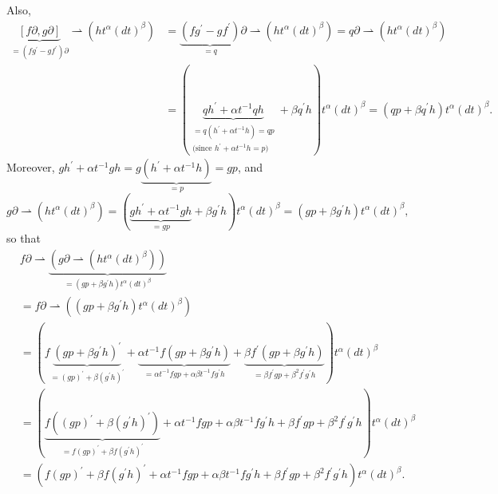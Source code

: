 \documentclass[etingof-lie.tex]{subfiles}
\begin{document}
Also,%
\begin{align*}
\underbrace{\left[  f\partial,g\partial\right]  }_{=\left(  fg^{\prime
}-gf^{\prime}\right)  \partial}\rightharpoonup\left(  ht^{\alpha}\left(
dt\right)  ^{\beta}\right)   &  =\underbrace{\left(  fg^{\prime}-gf^{\prime
}\right)  }_{=q}\partial\rightharpoonup\left(  ht^{\alpha}\left(  dt\right)
^{\beta}\right)  =q\partial\rightharpoonup\left(  ht^{\alpha}\left(
dt\right)  ^{\beta}\right) \\
&  =\left(  \underbrace{qh^{\prime}+\alpha t^{-1}qh}_{\substack{=q\left(
h^{\prime}+\alpha t^{-1}h\right)  =qp\\\text{(since }h^{\prime}+\alpha
t^{-1}h=p\text{)}}}+\beta q^{\prime}h\right)  t^{\alpha}\left(  dt\right)
^{\beta}=\left(  qp+\beta q^{\prime}h\right)  t^{\alpha}\left(  dt\right)
^{\beta}.
\end{align*}
Moreover, $gh^{\prime}+\alpha t^{-1}gh=g\underbrace{\left(  h^{\prime}+\alpha
t^{-1}h\right)  }_{=p}=gp$, and
\[
g\partial\rightharpoonup\left(  ht^{\alpha}\left(  dt\right)  ^{\beta}\right)
=\left(  \underbrace{gh^{\prime}+\alpha t^{-1}gh}_{=gp}+\beta g^{\prime
}h\right)  t^{\alpha}\left(  dt\right)  ^{\beta}=\left(  gp+\beta g^{\prime
}h\right)  t^{\alpha}\left(  dt\right)  ^{\beta},
\]
so that%
\begin{align}
&  f\partial\rightharpoonup\underbrace{\left(  g\partial\rightharpoonup\left(
ht^{\alpha}\left(  dt\right)  ^{\beta}\right)  \right)  }_{=\left(  gp+\beta
g^{\prime}h\right)  t^{\alpha}\left(  dt\right)  ^{\beta}}\nonumber\\
&  =f\partial\rightharpoonup\left(  \left(  gp+\beta g^{\prime}h\right)
t^{\alpha}\left(  dt\right)  ^{\beta}\right) \nonumber\\
&  =\left(  f\underbrace{\left(  gp+\beta g^{\prime}h\right)  ^{\prime}%
}_{=\left(  gp\right)  ^{\prime}+\beta\left(  g^{\prime}h\right)  ^{\prime}%
}+\underbrace{\alpha t^{-1}f\left(  gp+\beta g^{\prime}h\right)  }_{=\alpha
t^{-1}fgp+\alpha\beta t^{-1}fg^{\prime}h}+\underbrace{\beta f^{\prime}\left(
gp+\beta g^{\prime}h\right)  }_{=\beta f^{\prime}gp+\beta^{2}f^{\prime
}g^{\prime}h}\right)  t^{\alpha}\left(  dt\right)  ^{\beta}\nonumber\\
&  =\left(  \underbrace{f\left(  \left(  gp\right)  ^{\prime}+\beta\left(
g^{\prime}h\right)  ^{\prime}\right)  }_{=f\left(  gp\right)  ^{\prime}+\beta
f\left(  g^{\prime}h\right)  ^{\prime}}+\alpha t^{-1}fgp+\alpha\beta
t^{-1}fg^{\prime}h+\beta f^{\prime}gp+\beta^{2}f^{\prime}g^{\prime}h\right)
t^{\alpha}\left(  dt\right)  ^{\beta}\nonumber\\
&  =\left(  f\left(  gp\right)  ^{\prime}+\beta f\left(  g^{\prime}h\right)
^{\prime}+\alpha t^{-1}fgp+\alpha\beta t^{-1}fg^{\prime}h+\beta f^{\prime
}gp+\beta^{2}f^{\prime}g^{\prime}h\right)  t^{\alpha}\left(  dt\right)
^{\beta}. \label{sol1.1.2.var}%
\end{align}
\end{document}
